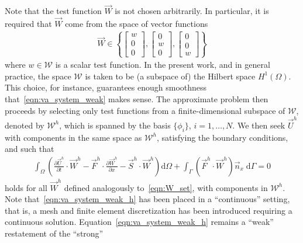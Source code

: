 %
Note that the test function $\vec{W}$ is not chosen arbitrarily.
In particular, it is required that $\vec{W}$ come from the space of
vector functions
\begin{align}
  \label{eqn:W_set}
  \vec{W} \in \left\{
      \begin{bmatrix}
        w \\ 0 \\ 0
      \end{bmatrix},
      \begin{bmatrix}
        0 \\ w \\ 0
      \end{bmatrix},
      \begin{bmatrix}
        0 \\ 0 \\ w
      \end{bmatrix}
    \right\}
\end{align}
where $w \in \mathcal{W}$ is a scalar test function.  In the present
work, and in general practice, the space $\mathcal{W}$ is taken to be
(a subspace of) the Hilbert space $H^1(\Omega)$. This choice, for
instance, guarantees enough smoothness that~\eqref{eqn:va_system_weak}
makes sense.
%
The approximate problem then proceeds by selecting only test functions
from a finite-dimensional subspace of $\mathcal{W}$, denoted by
$\mathcal{W}^h$, which is spanned by the basis $\{\phi_i\}$,
$i=1,\ldots,N$.  We then seek $\vec{U}^h$ with components in the same
space as $\mathcal{W}^h$, satisfying the boundary conditions, and such
that
\begin{align}
  \label{eqn:va_system_weak_h}
  \int_{\Omega} \left(\frac{\partial \vec{U}^h}{\partial t} \cdot \vec{W}^h
    - \vec{F}^h\cdot \frac{\partial \vec{W}^h}{\partial x} - \vec{S}^h\cdot\vec{W}^h \right) \text{d}\Omega
  + \int_{\Gamma} \left( \vec{F}^h \cdot \vec{W}^h \right) \vec{n}_x \;\text{d}\Gamma = 0
\end{align}
holds for all $\vec{W}^h$ defined analogously to~\eqref{eqn:W_set},
with components in $\mathcal{W}^h$. Note that~\eqref{eqn:va_system_weak_h} 
has been placed in a ``continuous'' setting, that is, a mesh and finite element
discretization has been introduced requiring a continuous solution.  
Equation~\eqref{eqn:va_system_weak_h} remains a ``weak'' restatement of the ``strong'' 
